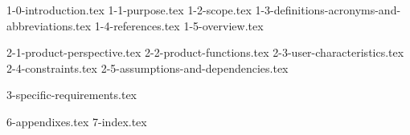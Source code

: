 \documentclass[12pt,nodisplayskipstretch]{article}
\begin{document}
{1-0-introduction.tex}
{1-1-purpose.tex}
{1-2-scope.tex}
{1-3-definitions-acronyms-and-abbreviations.tex}
{1-4-references.tex}
{1-5-overview.tex}

{2-1-product-perspective.tex}
{2-2-product-functions.tex}
{2-3-user-characteristics.tex}
{2-4-constraints.tex}
{2-5-assumptions-and-dependencies.tex}

{3-specific-requirements.tex}


{6-appendixes.tex}
{7-index.tex}
\end{document}
